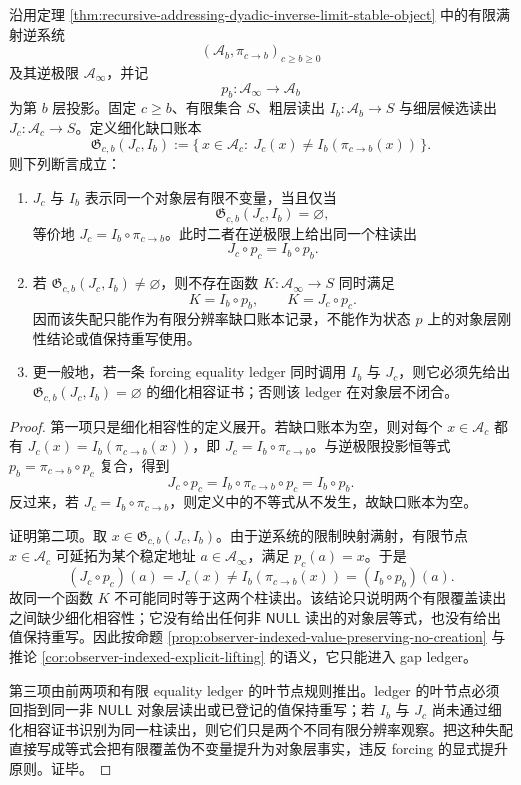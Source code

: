\begin{theorem}[有限读出不变量的细化稳定判别与缺口账本]\label{distill:cech_cohomology-refinement_stability_separation-recursive-readout-refinement-gap-ledger}
沿用定理 \ref{thm:recursive-addressing-dyadic-inverse-limit-stable-object} 中的有限满射逆系统
\[
(\mathcal A_b,\pi_{c\to b})_{c\ge b\ge0}
\]
及其逆极限 \(\mathcal A_\infty\)，并记
\[
p_b:\mathcal A_\infty\to\mathcal A_b
\]
为第 \(b\) 层投影。固定 \(c\ge b\)、有限集合 \(S\)、粗层读出
\(I_b:\mathcal A_b\to S\) 与细层候选读出 \(J_c:\mathcal A_c\to S\)。定义细化缺口账本
\[
\mathfrak G_{c,b}(J_c,I_b)
:=\{\,x\in\mathcal A_c:\ J_c(x)\ne I_b(\pi_{c\to b}(x))\,\}.
\]
则下列断言成立：
\begin{enumerate}
  \item \(J_c\) 与 \(I_b\) 表示同一个对象层有限不变量，当且仅当
  \[
  \mathfrak G_{c,b}(J_c,I_b)=\varnothing,
  \]
  等价地 \(J_c=I_b\circ\pi_{c\to b}\)。此时二者在逆极限上给出同一个柱读出
  \[
  J_c\circ p_c=I_b\circ p_b.
  \]
  \item 若 \(\mathfrak G_{c,b}(J_c,I_b)\ne\varnothing\)，则不存在函数
  \(K:\mathcal A_\infty\to S\) 同时满足
  \[
  K=I_b\circ p_b,\qquad K=J_c\circ p_c.
  \]
  因而该失配只能作为有限分辨率缺口账本记录，不能作为状态 \(p\) 上的对象层刚性结论或值保持重写使用。
  \item 更一般地，若一条 forcing equality ledger 同时调用 \(I_b\) 与 \(J_c\)，则它必须先给出
  \(\mathfrak G_{c,b}(J_c,I_b)=\varnothing\) 的细化相容证书；否则该 ledger 在对象层不闭合。
\end{enumerate}
\end{theorem}
\begin{proof}
第一项只是细化相容性的定义展开。若缺口账本为空，则对每个 \(x\in\mathcal A_c\) 都有
\(J_c(x)=I_b(\pi_{c\to b}(x))\)，即 \(J_c=I_b\circ\pi_{c\to b}\)。与逆极限投影恒等式
\(p_b=\pi_{c\to b}\circ p_c\) 复合，得到
\[
J_c\circ p_c=I_b\circ\pi_{c\to b}\circ p_c=I_b\circ p_b.
\]
反过来，若 \(J_c=I_b\circ\pi_{c\to b}\)，则定义中的不等式从不发生，故缺口账本为空。

证明第二项。取 \(x\in\mathfrak G_{c,b}(J_c,I_b)\)。由于逆系统的限制映射满射，有限节点 \(x\in\mathcal A_c\) 可延拓为某个稳定地址 \(a\in\mathcal A_\infty\)，满足 \(p_c(a)=x\)。于是
\[
(J_c\circ p_c)(a)=J_c(x)\ne I_b(\pi_{c\to b}(x))=(I_b\circ p_b)(a).
\]
故同一个函数 \(K\) 不可能同时等于这两个柱读出。该结论只说明两个有限覆盖读出之间缺少细化相容性；它没有给出任何非 \(\mathsf{NULL}\) 读出的对象层等式，也没有给出值保持重写。因此按命题 \ref{prop:observer-indexed-value-preserving-no-creation} 与推论 \ref{cor:observer-indexed-explicit-lifting} 的语义，它只能进入 gap ledger。

第三项由前两项和有限 equality ledger 的叶节点规则推出。ledger 的叶节点必须回指到同一非 \(\mathsf{NULL}\) 对象层读出或已登记的值保持重写；若 \(I_b\) 与 \(J_c\) 尚未通过细化相容证书识别为同一柱读出，则它们只是两个不同有限分辨率观察。把这种失配直接写成等式会把有限覆盖伪不变量提升为对象层事实，违反 forcing 的显式提升原则。证毕。
\end{proof}

